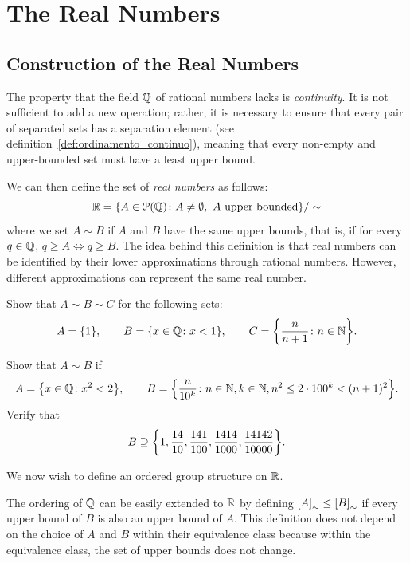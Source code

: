 \section{The Real Numbers}
\subsection{Construction of the Real Numbers}
\label{sec:costruzione_reali}

The property that the field ${\mathbb Q}$ of rational numbers lacks is
\emph{continuity}. It is not sufficient to add a new operation; rather, it is
necessary to ensure that every pair of separated sets has a separation element
(see definition~\ref{def:ordinamento_continuo}), meaning that every non-empty
and upper-bounded set must have a least upper bound.

We can then define the set of \emph{real numbers} as follows:
%
%
%
\[
{\mathbb R} = {\left\{ A \in \mathcal P({\mathbb Q})\colon A\neq \emptyset, \text{ $A$ upper bounded} \right\}}/\sim
\]
where we set $A\sim B$ if $A$ and $B$ have the same upper bounds, that is, if
for every $q\in {\mathbb Q}$, $q\ge A \iff q\ge B$. The idea behind this definition is
that real numbers can be identified by their lower approximations through
rational numbers. However, different approximations can represent the same real
number.

\begin{exercise}
  Show that $A \sim B \sim C$ for the following sets:
  \[
  A = {\left\{ 1 \right\}}, \qquad 
  B = {\left\{ x\in {\mathbb Q}\colon x<1 \right\}}, \qquad
  C = {\left\{ \frac{n}{n+1}\colon n\in {\mathbb N} \right\}}.
  \]
\end{exercise}

\begin{exercise}
  Show that $A\sim B$ if
  \[
  A = {\left\{ x\in {\mathbb Q}\colon x^2<2 \right\}}, \qquad
    B = {\left\{ \frac{n}{10^k}\colon n\in {\mathbb N}, k\in {\mathbb N}, n^2 \le 2\cdot 100^k <
  (n+1)^2 \right\}}.
  \]
  Verify that 
  \[
    B \supseteq {\left\{ 
      1,\frac{14}{10},\frac{141}{100},\frac{1414}{1000},
      \frac{14142}{10000} \right\}}.
  \]
\end{exercise}

We now wish to define an ordered group structure on ${\mathbb R}$.

The ordering of ${\mathbb Q}$ can be easily extended to ${\mathbb R}$ by defining
${\left[ A \right]}_\sim \le {\left[ B \right]}_\sim$ if every upper bound of $B$ is also an
upper bound of $A$. This definition does not depend on the choice of $A$ and $B$
within their equivalence class because within the equivalence class, the set of
upper bounds does not change.

